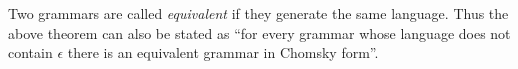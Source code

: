 

\setcounter{section}{5}
\setcounter{subsection}{2}
\setcounter{dfn}{6}


Two grammars are called \emph{equivalent} if they generate the same language.
Thus the above theorem can also be stated as
``for every grammar whose language does not contain $\epsilon$ there is an equivalent grammar in Chomsky form''.


